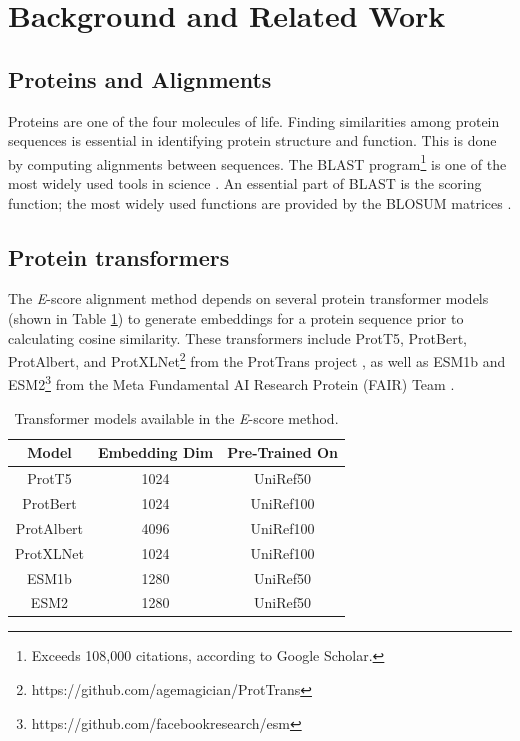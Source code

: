 \documentclass[
	letterpaper, %
	10pt, %
]{journalArticle}
\begin{document}
\section{Background and Related Work}

\subsection{Proteins and Alignments}
Proteins are one of the four molecules of life. Finding similarities among protein sequences is essential in identifying protein structure and function. This is done by computing alignments between sequences. The BLAST program\footnote{Exceeds 108,000 citations, according to Google Scholar.} is one of the most widely used tools in science \autocite{Atschul:1990}. An essential part of BLAST is the scoring function; the most widely used functions are provided by the BLOSUM matrices \autocite{Henikoff:1992}.

\subsection{Protein transformers}
The \textit{E}-score alignment method depends on several protein transformer models (shown in Table \ref{tab:transformers}) to generate embeddings for a protein sequence prior to calculating cosine similarity. These transformers include ProtT5, ProtBert, ProtAlbert, and ProtXLNet\footnote{https://github.com/agemagician/ProtTrans} from the ProtTrans project \autocite{Elnaggar:2021}, as well as ESM1b and ESM2\footnote{https://github.com/facebookresearch/esm} from the Meta Fundamental AI Research Protein (FAIR) Team \autocite{Rives:2021}.

\begin{table} %
	\caption{Transformer models available in the \textit{E}-score method.}
	\centering
	\begin{tabular}{ |c|c|c| }
		\toprule
		Model & Embedding Dim & Pre-Trained On \\
		\midrule
		ProtT5 & 1024 & UniRef50 \\
		ProtBert & 1024 & UniRef100 \\
		ProtAlbert & 4096 & UniRef100 \\
            ProtXLNet & 1024 & UniRef100 \\
            ESM1b & 1280 & UniRef50 \\
            ESM2 & 1280 & UniRef50 \\
		\bottomrule
	\end{tabular}
	\label{tab:transformers}
\end{table}
\end{document}
